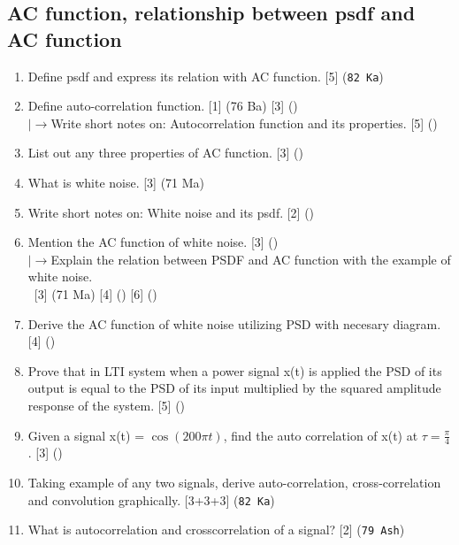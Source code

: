 \documentclass[12pt]{article}
\newcommand{\lb}{\\$\left|\rightarrow\right.$}
\newcommand{\enter}{\\\textcolor{white}{1}}
\begin{document}
    \subsection{AC function, relationship between psdf and AC function}
      \begin{enumerate}
        \item Define psdf and express its relation with AC function. \hfill [5] (\texttt{82 Ka})
        \item Define auto-correlation function. \hfill [1] (76 Ba) [3] ()
        \lb Write short notes on: Autocorrelation function and its properties. \hfill [5] ()

        \item List out any three properties of AC function. \hfill [3] ()

        \item What is white noise. \hfill [3] (71 Ma)
        
        \item Write short notes on: White noise and its psdf. \hfill [2] ()

        \item Mention the AC function of white noise. \hfill [3] ()
        \lb Explain the relation between PSDF and AC function with the example of white noise.
        \enter\hfill [3] (71 Ma) [4] () [6] ()
        
        \item Derive the AC function of white noise utilizing PSD with necesary diagram. \hfill [4] ()

        \item Prove that in LTI system when a power signal x(t) is applied the PSD of its output is equal to the PSD of its input multiplied by the squared amplitude response of the system. \hfill [5] ()

        \item Given a signal x(t) = $\cos (200\pi t)$, find the auto correlation of x(t) at $\tau = \frac{\pi}{4}$. \hfill [3] ()

        \item Taking example of any two signals, derive auto-correlation, cross-correlation and convolution graphically. \hfill [3+3+3] (\texttt{82 Ka})

        \item What is autocorrelation and crosscorrelation of a signal? \hfill [2] (\texttt{79 Ash})


\end{enumerate}
\end{document}
